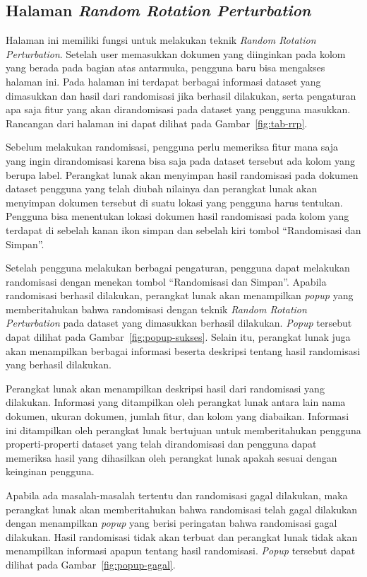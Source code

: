 \subsection{Halaman \textit{Random Rotation Perturbation}}
\label{subsec:tabrrp}

Halaman ini memiliki fungsi untuk melakukan teknik \textit{Random Rotation Perturbation}. Setelah user memasukkan dokumen yang diinginkan pada kolom yang berada pada bagian atas antarmuka, pengguna baru bisa mengakses halaman ini. Pada halaman ini terdapat berbagai informasi dataset yang dimasukkan dan hasil dari randomisasi jika berhasil dilakukan, serta pengaturan apa saja fitur yang akan dirandomisasi pada dataset yang pengguna masukkan. Rancangan dari halaman ini dapat dilihat pada Gambar~\ref{fig:tab-rrp}.

Sebelum melakukan randomisasi, pengguna perlu memeriksa fitur mana saja yang ingin dirandomisasi karena bisa saja pada dataset tersebut ada kolom yang berupa label. Perangkat lunak akan menyimpan hasil randomisasi pada dokumen dataset pengguna yang telah diubah nilainya dan perangkat lunak akan menyimpan dokumen tersebut di suatu lokasi yang pengguna harus tentukan. Pengguna bisa menentukan lokasi dokumen hasil randomisasi pada kolom yang terdapat di sebelah kanan ikon simpan dan sebelah kiri tombol \textquotedblleft Randomisasi dan Simpan\textquotedblright.

Setelah pengguna melakukan berbagai pengaturan, pengguna dapat melakukan randomisasi dengan menekan tombol \textquotedblleft Randomisasi dan Simpan\textquotedblright. Apabila randomisasi berhasil dilakukan, perangkat lunak akan menampilkan \textit{popup} yang memberitahukan bahwa randomisasi dengan teknik \textit{Random Rotation Perturbation} pada dataset yang dimasukkan berhasil dilakukan. \textit{Popup} tersebut dapat dilihat pada Gambar~\ref{fig:popup-sukses}. Selain itu, perangkat lunak juga akan menampilkan berbagai informasi beserta deskripsi tentang hasil randomisasi yang berhasil dilakukan.

Perangkat lunak akan menampilkan deskripsi hasil dari randomisasi yang dilakukan. Informasi yang ditampilkan oleh perangkat lunak antara lain nama dokumen, ukuran dokumen, jumlah fitur, dan kolom yang diabaikan. Informasi ini ditampilkan oleh perangkat lunak bertujuan untuk memberitahukan pengguna properti-properti dataset yang telah dirandomisasi dan pengguna dapat memeriksa hasil yang dihasilkan oleh perangkat lunak apakah sesuai dengan keinginan pengguna.

Apabila ada masalah-masalah tertentu dan randomisasi gagal dilakukan, maka perangkat lunak akan memberitahukan bahwa randomisasi telah gagal dilakukan dengan menampilkan \textit{popup} yang berisi peringatan bahwa randomisasi gagal dilakukan. Hasil randomisasi tidak akan terbuat dan perangkat lunak tidak akan menampilkan informasi apapun tentang hasil randomisasi. \textit{Popup} tersebut dapat dilihat pada Gambar~\ref{fig:popup-gagal}.

